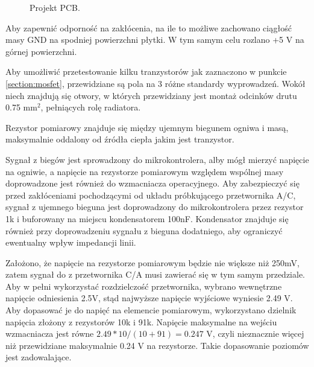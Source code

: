 \documentclass[polish,engineer]{polsl-msth}
\begin{document}
\begin{figure}[hbtp]
     \caption{Projekt PCB. \label{img:pcb_colored}}
\end{figure}

Aby zapewnić odporność na zakłócenia, na ile to możliwe zachowano ciągłość masy GND na spodniej powierzchni płytki. W tym samym celu rozlano +5 V na górnej powierzchni. 

Aby umożliwić przetestowanie kilku tranzystorów jak zaznaczono w punkcie \ref{section:mosfet}, przewidziane są pola na 3 różne standardy wyprowadzeń. Wokół niech znajdują się otwory, w których przewidziany jest montaż odcinków drutu 0.75 mm$^2$, pełniących rolę radiatora.

Rezystor pomiarowy znajduje się między ujemnym biegunem ogniwa i masą, maksymalnie oddalony od źródła ciepła jakim jest tranzystor. 

Sygnał z biegów jest sprowadzony do mikrokontrolera, alby mógł mierzyć napięcie na ogniwie, a napięcie na rezystorze pomiarowym względem wspólnej masy doprowadzone jest również do wzmacniacza operacyjnego. Aby zabezpieczyć się przed zakłóceniami pochodzącymi od układu próbkującego przetwornika A/C, sygnał z ujemnego bieguna jest doprowadzony do mikrokontrolera przez rezystor 1k i buforowany na miejscu kondensatorem 100nF. Kondensator znajduje się również przy doprowadzeniu sygnału z bieguna dodatniego, aby ograniczyć ewentualny wpływ impedancji linii.

Założono, że napięcie na rezystorze pomiarowym będzie nie większe niż 250mV, zatem sygnał do z przetwornika C/A musi zawierać się w tym samym przedziale. Aby w pełni wykorzystać rozdzielczość przetwornika, wybrano wewnętrzne napięcie odniesienia 2.5V, stąd najwyższe napięcie wyjściowe wyniesie 2.49 V. Aby dopasować je do napięć na elemencie pomiarowym, wykorzystano dzielnik napięcia złożony z rezystorów 10k i 91k. Napięcie maksymalne na wejściu wzmacniacza jest równe $2.49*10/(10+91) = 0.247$ V, czyli nieznacznie więcej niż przewidziane maksymalnie 0.24 V na rezystorze. Takie dopasowanie poziomów jest zadowalające.
\end{document}
